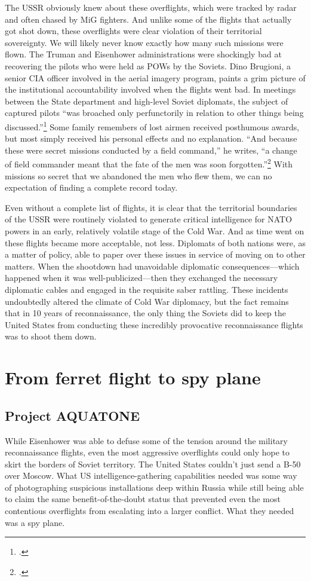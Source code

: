 \documentclass{report}
\begin{document}
\begin{refsegment}
The USSR obviously knew about these overflights, which were tracked by radar and often chased by MiG fighters. And unlike some of the flights that actually got shot down, these overflights were clear violation of their territorial sovereignty. We will likely never know exactly how many such missions were flown. The Truman and Eisenhower administrations were shockingly bad at recovering the pilots who were held as POWs by the Soviets. Dino Brugioni, a senior CIA officer involved in the aerial imagery program, paints a grim picture of the institutional accountability involved when the flights went bad. In meetings between the State department and high-level Soviet diplomats, the subject of captured pilots ``was broached only perfunctorily in relation to other things being discussed.''\footcite[p.~72]{brugioni_eyes_2010} Some family remembers of lost airmen received posthumous awards, but most simply received his personal effects and no explanation. ``And because these were secret missions conducted by a field command,'' he writes, ``a change of field commander meant that the fate of the men was soon forgotten.''\footcite[p.~72]{brugioni_eyes_2010} With missions so secret that we abandoned the men who flew them, we can no expectation of finding a complete record today.

Even without a complete list of flights, it is clear that the territorial boundaries of the USSR were routinely violated to generate critical intelligence for NATO powers in an early, relatively volatile stage of the Cold War. And as time went on these flights became more acceptable, not less. Diplomats of both nations were, as a matter of policy, able to paper over these issues in service of moving on to other matters. When the shootdown had unavoidable diplomatic consequences---which happened when it was well-publicized---then they exchanged the necessary diplomatic cables and engaged in the requisite saber rattling. These incidents undoubtedly altered the climate of Cold War diplomacy, but the fact remains that in 10 years of reconnaissance, the only thing the Soviets did to keep the United States from conducting these incredibly provocative reconnaissance flights was to shoot them down.

\section{From ferret flight to spy plane}
\subsection{Project AQUATONE}
While Eisenhower was able to defuse some of the tension around the military reconnaissance flights, even the most aggressive overflights could only hope to skirt the borders of Soviet territory. The United States couldn't just send a B-50 over Moscow. What US intelligence-gathering capabilities needed was some way of photographing suspicious installations deep within Russia while still being able to claim the same benefit-of-the-doubt status that prevented even the most contentious overflights from escalating into a larger conflict. What they needed was a spy plane.


\end{refsegment}
\end{document}
